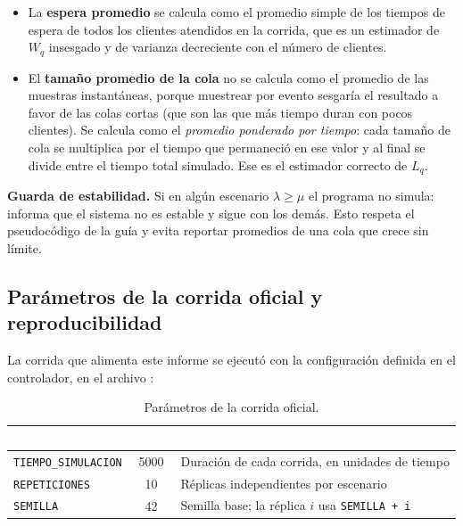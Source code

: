 \documentclass[11pt,a4paper]{article}
\renewcommand{\arraystretch}{1.08}
\begin{document}
\begin{itemize}
    \item La \textbf{espera promedio} se calcula como el promedio simple de los tiempos
    de espera de todos los clientes atendidos en la corrida, que es un estimador de
    $W_q$ insesgado y de varianza decreciente con el número de clientes.
    \item El \textbf{tamaño promedio de la cola} no se calcula como el promedio de las
    muestras instantáneas, porque muestrear por evento sesgaría el resultado a favor de
    las colas cortas (que son las que más tiempo duran con pocos clientes). Se calcula
    como el \emph{promedio ponderado por tiempo}: cada tamaño de cola se multiplica por
    el tiempo que permaneció en ese valor y al final se divide entre el tiempo total
    simulado. Ese es el estimador correcto de $L_q$.
\end{itemize}

\noindent\textbf{Guarda de estabilidad.} Si en algún escenario $\lambda \geq \mu$ el
programa no simula: informa que el sistema no es estable y sigue con los demás. Esto
respeta el pseudocódigo de la guía y evita reportar promedios de una cola que crece sin
límite.

\subsection{Parámetros de la corrida oficial y reproducibilidad}

La corrida que alimenta este informe se ejecutó con la configuración definida en el
controlador, en el archivo :

\begin{table}[h!]
\centering
\setlength{\arrayrulewidth}{0.75pt}
\renewcommand{\arraystretch}{1.25}
\begin{tabular}{|l|c|l|}
\hline
\rowcolor{headerblue}
\textbf{\textcolor{white}{Variable}} & \textbf{\textcolor{white}{Valor}} & \textbf{\textcolor{white}{Qué controla}} \\ \hline
\texttt{TIEMPO\_SIMULACION} & 5000 & Duración de cada corrida, en unidades de tiempo \\ \hline
\rowcolor{rowlight}
\texttt{REPETICIONES} & 10 & Réplicas independientes por escenario \\ \hline
\texttt{SEMILLA} & 42 & Semilla base; la réplica $i$ usa \texttt{SEMILLA + i} \\ \hline
\end{tabular}
\caption{Parámetros de la corrida oficial.}
\end{table}
\end{document}
